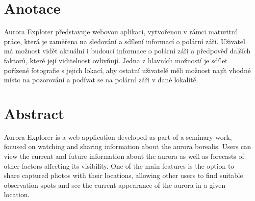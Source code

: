 \thispagestyle{empty}

\section*{\LARGE  \textbf{Anotace} } 
\par Aurora Explorer představuje webovou aplikaci, vytvořenou v rámci maturitní práce, která je zaměřena na sledování a sdílení informací o polární záři. Uživatel má možnost vidět aktuální i budoucí informace o polární záři a předpověď dalších faktorů, které její viditelnost ovlivňují. Jedna z hlavních možností je sdílet pořízené fotografie s jejich lokací, aby ostatní uživatelé měli možnost najít vhodné místo na pozorování a podívat se na polární záři v dané lokalitě.

\vspace{40pt}

\section*{\LARGE \textbf{Abstract} }
\par Aurora Explorer is a web application developed as part of a seminary work, focused on watching and sharing information about the aurora borealis. Users can view the current and future information about the aurora as well as forecasts of other factors affecting its visibility. One of the main features is the option to share captured photos with their locations, allowing other users to find suitable observation spots and see the current appearance of the aurora in a given location.